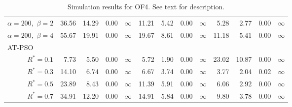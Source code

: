 \documentclass[cmbright]{staauth}
\begin{document}
\begin{table}[ht]
{\begin{tabular}{r|rrrr|rrrr|rrrr}
  $\alpha = 200,$ $\beta =2$ & 36.56 & 14.29 & 0.00 & $\infty$ & 11.21 & 5.42 & 0.00 & $\infty$ & 5.28 & 2.77 & 0.00 & $\infty$ \\
  $\alpha = 200,$ $\beta =4$ & 55.67 & 19.91 & 0.00 & $\infty$ & 19.67 & 8.61 & 0.00 & $\infty$ & 11.18 & 5.41 & 0.00 & $\infty$ \\
\hline
\multicolumn{1}{l|}{AT-PSO} &&&&&&&&&&&&\\
  $R^* = 0.1$ & 7.73 & 5.50 & 0.00 & $\infty$ & 5.72 & 1.90 & 0.00 & $\infty$ & 23.02 & 10.87 & 0.00 & $\infty$ \\
  $R^* = 0.3$ & 14.10 & 6.74 & 0.00 & $\infty$ & 6.67 & 3.74 & 0.00 & $\infty$ & 3.77 & 2.04 & 0.02 & $\infty$ \\
  $R^* = 0.5$ & 23.89 & 8.43 & 0.00 & $\infty$ & 11.39 & 5.91 & 0.00 & $\infty$ & 6.06 & 2.92 & 0.00 & $\infty$ \\
  $R^* = 0.7$ & 34.91 & 12.20 & 0.00 & $\infty$ & 14.91 & 5.84 & 0.00 & $\infty$ & 9.80 & 3.78 & 0.00 & $\infty$ \\
   \hline
\end{tabular}
}
\caption{Simulation results for OF4. See text for description.}
\label{tab:psosim4}
\end{table}
\end{document}
